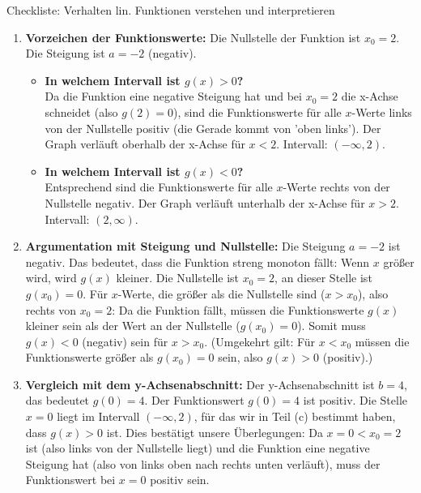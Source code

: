\begin{loesungsumgebung}{Checkliste: Verhalten lin. Funktionen verstehen und interpretieren}
\begin{enumerate}[label=(\alph*)]
    \item \textbf{Vorzeichen der Funktionswerte:}
    Die Nullstelle der Funktion ist $x_0=2$. Die Steigung ist $a=-2$ (negativ).
    \begin{itemize}
        \item \textbf{In welchem Intervall ist $g(x) > 0$?} \\
        Da die Funktion eine negative Steigung hat und bei $x_0=2$ die x-Achse schneidet (also $g(2)=0$), sind die Funktionswerte für alle $x$-Werte links von der Nullstelle positiv (die Gerade kommt von 'oben links').
        Der Graph verläuft oberhalb der x-Achse für $x < 2$. Intervall: $(-\infty, 2)$.
        \item \textbf{In welchem Intervall ist $g(x) < 0$?} \\
        Entsprechend sind die Funktionswerte für alle $x$-Werte rechts von der Nullstelle negativ.
        Der Graph verläuft unterhalb der x-Achse für $x > 2$. Intervall: $(2, \infty)$.
    \end{itemize}

    \item \textbf{Argumentation mit Steigung und Nullstelle:}
    Die Steigung $a=-2$ ist negativ. Das bedeutet, dass die Funktion streng monoton fällt: Wenn $x$ größer wird, wird $g(x)$ kleiner.
    Die Nullstelle ist $x_0=2$, an dieser Stelle ist $g(x_0)=0$.
    Für $x$-Werte, die größer als die Nullstelle sind ($x > x_0$), also rechts von $x_0=2$: Da die Funktion fällt, müssen die Funktionswerte $g(x)$ kleiner sein als der Wert an der Nullstelle ($g(x_0)=0$). Somit muss $g(x) < 0$ (negativ) sein für $x > x_0$.
    (Umgekehrt gilt: Für $x < x_0$ müssen die Funktionswerte größer als $g(x_0)=0$ sein, also $g(x) > 0$ (positiv).)

    \item \textbf{Vergleich mit dem y-Achsenabschnitt:}
    Der y-Achsenabschnitt ist $b=4$, das bedeutet $g(0)=4$.
    Der Funktionswert $g(0)=4$ ist positiv.
    Die Stelle $x=0$ liegt im Intervall $(-\infty, 2)$, für das wir in Teil (c) bestimmt haben, dass $g(x) > 0$ ist.
    Dies bestätigt unsere Überlegungen: Da $x=0 < x_0=2$ ist (also links von der Nullstelle liegt) und die Funktion eine negative Steigung hat (also von links oben nach rechts unten verläuft), muss der Funktionswert bei $x=0$ positiv sein.


\end{enumerate}
\end{loesungsumgebung}
